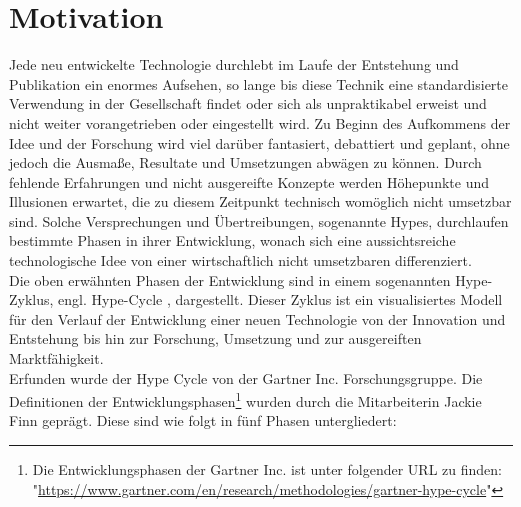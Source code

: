 \section{Motivation}
\label{sec:Motivation}
    Jede neu entwickelte Technologie durchlebt im Laufe der Entstehung und Publikation ein enormes Aufsehen, 
    so lange bis diese Technik eine standardisierte Verwendung in der Gesellschaft findet oder sich als 
    unpraktikabel erweist und nicht weiter vorangetrieben oder eingestellt wird. Zu Beginn des Aufkommens der Idee 
    und der Forschung wird viel darüber fantasiert, debattiert und geplant, ohne jedoch die Ausmaße, Resultate und 
    Umsetzungen abwägen zu können. Durch fehlende Erfahrungen und nicht ausgereifte 
    Konzepte werden Höhepunkte und Illusionen erwartet, die zu diesem Zeitpunkt technisch womöglich nicht umsetzbar sind. 
    Solche Versprechungen und Übertreibungen, sogenannte Hypes, durchlaufen bestimmte Phasen in ihrer Entwicklung, wonach 
    sich eine aussichtsreiche technologische Idee von einer wirtschaftlich nicht umsetzbaren differenziert. 
    \\
    \linebreak
    Die oben erwähnten Phasen der Entwicklung sind in einem sogenannten Hype-Zyklus, engl. Hype-Cycle \cite{gartner.2022m}, dargestellt. 
    Dieser Zyklus ist ein visualisiertes Modell für den Verlauf der Entwicklung einer neuen Technologie von der Innovation 
    und Entstehung bis hin zur Forschung, Umsetzung und zur ausgereiften Marktfähigkeit. 
    \\
    Erfunden wurde der Hype Cycle von der Gartner Inc. Forschungsgruppe. Die Definitionen der 
    Entwicklungsphasen\footnote{Die Entwicklungsphasen der Gartner Inc. ist unter folgender URL zu finden: "\url{https://www.gartner.com/en/research/methodologies/gartner-hype-cycle}"} 
    wurden durch die Mitarbeiterin Jackie Finn geprägt. Diese sind wie folgt in fünf Phasen untergliedert: 
